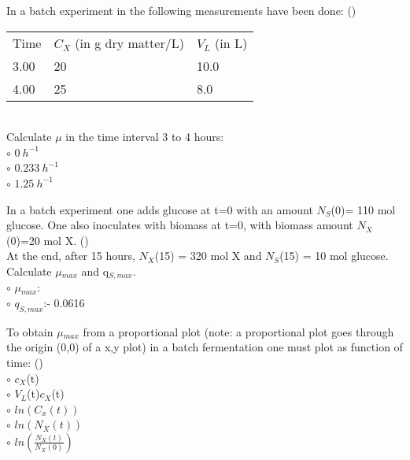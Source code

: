 \documentclass[]{beamer}
\begin{document}
\begin{frame}[shrink] {} 
\color{blue}
  In a batch experiment in the following measurements have been done:
 ({\color{green}{Q8}})\\
\color{gray}
\begin{tabular}[ ]{l l l}
Time & $C_{X}$ (in g dry matter/L) & $V_{L}$ (in L)  \\
3.00 & 20 & 10.0  \\
4.00 & 25 & 8.0  \\
\end{tabular}  \\
\color{blue}
  Calculate $\mu$ in the time interval 3 to 4 hours:
  \\
\color{black}
\setlength{\parindent}{-0.4cm}
{\color{red}$\circ$} $0 ~h^{-1}$  \\
{\color{red}$\circ$} $0.233 ~h^{-1}$  \\
{\color{red}$\circ$} $1.25 ~h^{-1}$  \\
\end{frame}


\begin{frame}[shrink] {} 
\color{blue}
In a batch experiment one adds glucose at t=0 with an amount $N_{S}$(0)= 110 mol glucose. One also inoculates with biomass at t=0, with biomass amount $N_{X}$(0)=20 mol X. ({\color{green}{Q9}})\\
At the end, after 15 hours, $N_{X}$(15) = 320 mol X and $N_{S}$(15) = 10 mol glucose.  \\
Calculate $\mu$$_{max}$ and q$_{S,max}$.  \\[.5em]
\color{black}
\setlength{\parindent}{-0.4cm}
{\color{red}$\circ$} $\mu$$_{max}$:  \\
{\color{red}$\circ$} $q_{S,max}$:\quad - 0.0616 \\
\end{frame}


\begin{frame}[shrink] {} 
\color{blue}
To obtain $\mu$$_{max}$ from a proportional plot (note: a proportional plot goes through the origin (0,0) of a x,y plot) in a batch fermentation one must plot as function of time: ({\color{green}{Q10}})\\[0.5em]
\color{black}
\setlength{\parindent}{-0.4cm}
{\color{red}$\circ$} $c_{X}$(t)  \\[0.3em]
{\color{red}$\circ$} $V_{L}$(t)$c_{X}$(t)  \\[0.3em]
{\color{red}$\circ$} $ln(C_x(t))$  \\[0.3em]
{\color{red}$\circ$} $ln(N_X(t))$  \\[0.3em]
{\color{red}$\circ$} $ln(\frac{N_X(t)}{N_X(0)})$  \\[0.3em]
\end{frame}
\end{document}
